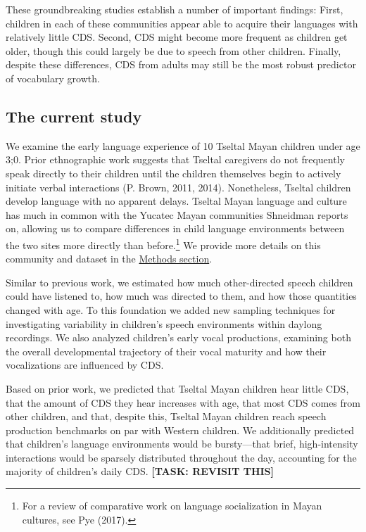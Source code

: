 \documentclass[floatsintext,man]{apa6}
\theoremstyle{definition}
\theoremstyle{definition}
\theoremstyle{definition}
\theoremstyle{remark}
\begin{document}
These groundbreaking studies establish a number of important findings:
First, children in each of these communities appear able to acquire
their languages with relatively little CDS. Second, CDS might become
more frequent as children get older, though this could largely be due to
speech from other children. Finally, despite these differences, CDS from
adults may still be the most robust predictor of vocabulary growth.

\subsection{The current study}\label{intro-currentstudy}

We examine the early language experience of 10 Tseltal Mayan children
under age 3;0. Prior ethnographic work suggests that Tseltal caregivers
do not frequently speak directly to their children until the children
themselves begin to actively initiate verbal interactions (P. Brown,
2011, 2014). Nonetheless, Tseltal children develop language with no
apparent delays. Tseltal Mayan language and culture has much in common
with the Yucatec Mayan communities Shneidman reports on, allowing us to
compare differences in child language environments between the two sites
more directly than before.\footnote{For a review of comparative work on
  language socialization in Mayan cultures, see Pye (2017).} We provide
more details on this community and dataset in the
\protect\hyperlink{methods}{Methods section}.

Similar to previous work, we estimated how much other-directed speech
children could have listened to, how much was directed to them, and how
those quantities changed with age. To this foundation we added new
sampling techniques for investigating variability in children's speech
environments within daylong recordings. We also analyzed children's
early vocal productions, examining both the overall developmental
trajectory of their vocal maturity and how their vocalizations are
influenced by CDS.

Based on prior work, we predicted that Tseltal Mayan children hear
little CDS, that the amount of CDS they hear increases with age, that
most CDS comes from other children, and that, despite this, Tseltal
Mayan children reach speech production benchmarks on par with Western
children. We additionally predicted that children's language
environments would be bursty---that brief, high-intensity interactions
would be sparsely distributed throughout the day, accounting for the
majority of children's daily CDS. \textbf{{[}TASK: REVISIT THIS{]}}
\end{document}

